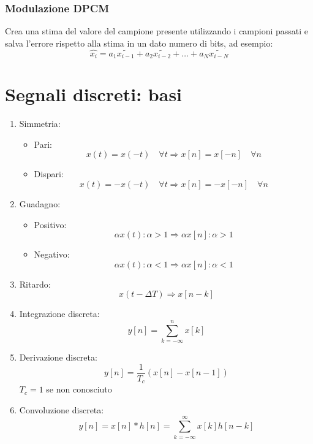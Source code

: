\subsubsection*{Modulazione DPCM}
Crea una stima del valore del campione presente utilizzando i campioni passati e salva l'errore rispetto alla stima in un dato numero di bits, ad esempio:
\[
	\hat{x_i} = a_1 \tilde{x_{i-1}} + a_2 \tilde{x_{i-2}} + \ldots + a_N \tilde{x_{i-N}}
\]

\section{Segnali discreti: basi}

\begin{enumerate}
	\item Simmetria:
	      \begin{itemize}
		      \item Pari:
		            \[
			            x(t) = x(-t) \quad \forall t \Rightarrow  x[n] = x[-n] \quad \forall n
		            \]
		      \item Dispari:
		            \[
			            x(t) = -x(-t) \quad \forall t \Rightarrow  x[n] = -x[-n] \quad \forall n
		            \]
	      \end{itemize}

	\item Guadagno:
	      \begin{itemize}
		      \item Positivo:
		            \[
			            \alpha x(t) : \alpha > 1 \Rightarrow \alpha x[n] : \alpha > 1
		            \]
		      \item Negativo:
		            \[
			            \alpha x(t) : \alpha < 1 \Rightarrow \alpha x[n] : \alpha < 1
		            \]
	      \end{itemize}

	\item Ritardo:
	      \[
		      x(t - \Delta T) \Rightarrow x[n - k]
	      \]

	\item Integrazione discreta:
	      \[
		      y[n] = \sum_{k=-\infty}^{n} x[k]
	      \]

	\item Derivazione discreta:
	      \[
		      y[n] = \frac{1}{T_c} (x[n] - x[n-1])
	      \]
	      $ T_c = 1$ se non conosciuto

	\item Convoluzione discreta:
	      \[
		      y[n] = x[n] * h[n] = \sum_{k=-\infty}^{\infty} x[k] h[n-k]
	      \]

\end{enumerate}
